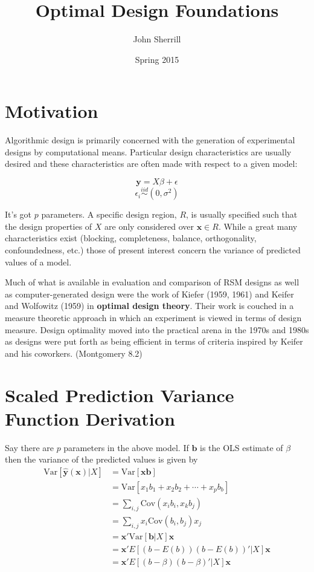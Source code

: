 \documentclass{article}\usepackage[]{graphicx}\usepackage[]{color}
\title{\vspace{-70pt} Optimal Design Foundations \vspace{-10pt}}
\author{John Sherrill\vspace{-20pt}}
\date{Spring 2015 \vspace{-10pt}}
\newcommand{\Var}{\mathrm{Var}}
\newcommand{\Cov}{\mathrm{Cov}}
\begin{document}
\maketitle

\section{Motivation}

Algorithmic design is primarily concerned with the generation of experimental designs by computational means. Particular design characteristics are usually desired and these characteristics are often made with respect to a given model:

$$ \textbf{y} = X\beta + \epsilon $$
$$ \epsilon_i \stackrel{iid}{\sim} (0, \sigma^2) $$

It's got $p$ parameters. A specific design region, $R$, is usually specified such that the design properties of $X$ are only considered over $\textbf{x} \in R$. While a great many characteristics exist (blocking, completeness, balance, orthogonality, confoundedness, etc.) those of present interest concern the variance of predicted values of a model.

Much of what is available in evaluation and comparison of RSM designs as well as computer-generated design were the work of Kiefer (1959, 1961) and Keifer and Wolfowitz (1959) in \textbf{optimal design theory}. Their work is couched in a measure theoretic approach in which an experiment is viewed in terms of design measure. Design optimality moved into the practical arena in the 1970s and 1980s as designs were put forth as being efficient in terms of criteria inspired by Keifer and his coworkers. (Montgomery 8.2)

\section{Scaled Prediction Variance Function Derivation}

Say there are $p$ parameters in the above model. If $\textbf{b}$ is the OLS estimate of $\beta$ then the variance of the predicted values is given by
\begin{align*}
  \Var[\hat{\textbf{y}}(\textbf{x}) | X] &= \Var[\textbf{xb}] \\
  &= \Var[x_1 b_1 + x_2 b_2 + \cdots + x_p b_b] \\
  &= \sum_{i,j} \Cov(x_i b_i, x_k b_j) \\
  &= \sum_{i,j} x_i \Cov(b_i, b_j) x_j \\
  &= \textbf{x}' \Var[\textbf{b} | X] \textbf{x} \\
  &= \textbf{x}' E[(b-E(b)) (b-E(b))' | X] \textbf{x} \\
  &= \textbf{x}' E[(b-\beta)(b-\beta)' | X] \textbf{x} \\
\end{align*}
\end{document}
